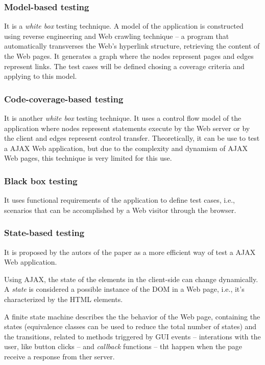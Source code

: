 \documentclass[a4paper]{article}
\begin{document}
\subsubsection{Model-based testing}

It is a \emph{white box} testing technique.
A model of the application is constructed using reverse engineering and Web crawling technique -- a program that automatically transverses the Web's hyperlink structure, retrieving the content of the Web pages.
It generates a graph where the nodes represent pages and edges represent links.
The test cases will be defined chosing a coverage criteria and applying to this model. 

\subsubsection{Code-coverage-based testing} 

It is another \emph{white box} testing technique. 
It uses a control flow model of the application where nodes represent statements execute by the Web server or by the client and edges represent control transfer.
Theoretically, it can be use to test a AJAX Web application, but due to the complexity and dynamism of AJAX Web pages, this technique is very limited for this use.

\subsubsection{Black box testing} 

It uses functional requirements of the application to define test cases, i.e., scenarios that can be accomplished by a Web visitor through the browser.

\subsubsection{State-based testing}

It is proposed by the autors of the paper as a more efficient way of test a AJAX Web application.

Using AJAX, the state of the elements in the client-side can change dynamically.
A \emph{state} is considered a possible instance of the DOM in a Web page, i.e., it's characterized by the HTML elements.

A finite state machine describes the the behavior of the Web page, containing the states (equivalence classes can be used to reduce the total number of states) and the transitions, related to methods triggered by GUI events -- interations with the user, like button clicks -- and \emph{callback} functions -- tht happen when the page receive a response from ther server.
\end{document}
